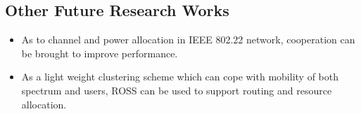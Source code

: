 

%
%
%
%
%
%
%

\subsection*{Other Future Research Works}
\begin{itemize}
\item As to channel and power allocation in IEEE 802.22 network, cooperation can be brought to improve performance. 

\item As a light weight clustering scheme which can cope with mobility of both spectrum and users, ROSS can be used to support routing and resource allocation.
\end{itemize}




